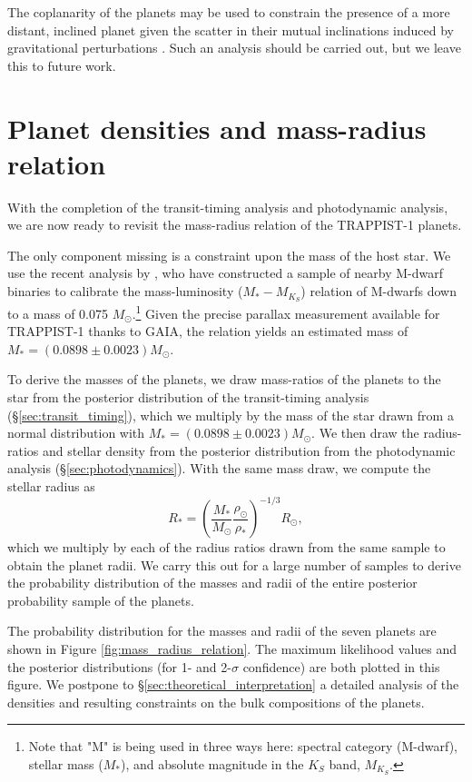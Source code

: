 \documentclass[fleqn,usenatbib]{mnras} %
\begin{document}
The coplanarity of the planets may be used to constrain the presence of a
more distant, inclined planet given the scatter in their mutual inclinations
induced by gravitational perturbations \citep{JontofHutter2018}.  Such an
analysis should be carried out, but we leave this to future work.

\section{Planet densities and mass-radius relation} \label{sec:mass_radius_relation}

With the completion of the transit-timing analysis and photodynamic analysis, we are now ready to revisit the mass-radius relation of the TRAPPIST-1 planets.  

The only component missing is a constraint upon the mass of the host star.  We use the recent analysis by \citet{Mann2019}, who have constructed a sample of nearby M-dwarf binaries to calibrate the mass-luminosity ($M_*-M_{K_S}$) relation of M-dwarfs down to a mass of 0.075 $M_\odot$.\footnote{Note that "M" is being used in three ways here: spectral category (M-dwarf), stellar mass ($M_*$), and
absolute magnitude in the $K_S$ band, $M_{K_S}$.}   Given the precise parallax measurement available for TRAPPIST-1 thanks to GAIA, the relation yields an estimated mass of $M_* = (0.0898\pm 0.0023) M_\odot$.

To derive the masses of the planets, we draw mass-ratios of the planets to the star from the posterior distribution of the transit-timing analysis (\S \ref{sec:transit_timing}), which we multiply by the mass of the star drawn from a normal distribution with $M_* = (0.0898\pm 0.0023) M_\odot$. We then draw the radius-ratios and stellar density from the posterior distribution from the photodynamic analysis (\S \ref{sec:photodynamics}).
With the same mass draw, we compute the stellar radius as
\begin{equation}
    R_* = \left(\frac{M_*}{M_\odot}\frac{\rho_\odot}{\rho_*}\right)^{-1/3} R_\odot,
\end{equation} 
which we multiply by each of the radius ratios drawn from the same sample to obtain the planet radii.   We carry this out for a large number of samples to derive the probability distribution of the masses and radii of the entire posterior probability sample of the planets.

The probability distribution for the masses and radii of the seven planets are shown in Figure \ref{fig:mass_radius_relation}.  The maximum likelihood values and the posterior distributions (for 1- and 2-$\sigma$ confidence) are both plotted in this figure.  We postpone to \S\ref{sec:theoretical_interpretation} a detailed analysis of the densities and resulting constraints on the bulk compositions of the planets.
\end{document}
